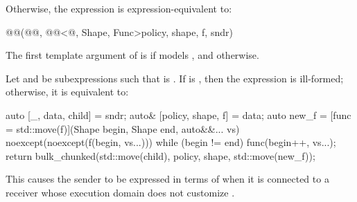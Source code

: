 \pnum
Otherwise,
the expression 
is expression-equivalent to:
\begin{codeblock}
@@(@@, @@<@\seebelow@, Shape, Func>{policy, shape, f}, sndr)
\end{codeblock}
The first template argument of  is 
if  models , and
 otherwise.

\pnum
Let  and  be subexpressions such that
 is .
If  is , then
the expression  is ill-formed;
otherwise, it is equivalent to:
\begin{codeblock}
auto [_, data, child] = sndr;
auto& [policy, shape, f] = data;
auto new_f = [func = std::move(f)](Shape begin, Shape end, auto&&... vs)
    noexcept(noexcept(f(begin, vs...))) {
  while (begin != end) func(begin++, vs...);
}
return bulk_chunked(std::move(child), policy, shape, std::move(new_f));
\end{codeblock}
\begin{note}
This causes the  sender to be
expressed in terms of  when
it is connected to a receiver whose
execution domain does not customize .
\end{note}

